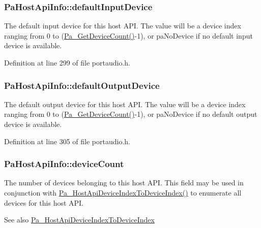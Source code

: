 \subsubsection[{\texorpdfstring{default\+Input\+Device}{defaultInputDevice}}]{ Pa\+Host\+Api\+Info\+::default\+Input\+Device}\hypertarget{struct_pa_host_api_info_a85a62057c3479d3efaa477d8562cf21d}{}\label{struct_pa_host_api_info_a85a62057c3479d3efaa477d8562cf21d}
The default input device for this host A\+PI. The value will be a device index ranging from 0 to (\hyperlink{portaudio_8h_acfe4d3c5ec1a343f459981bfa2057f8d}{Pa\+\_\+\+Get\+Device\+Count()}-\/1), or pa\+No\+Device if no default input device is available. 

Definition at line 299 of file portaudio.\+h.

\subsubsection[{\texorpdfstring{default\+Output\+Device}{defaultOutputDevice}}]{ Pa\+Host\+Api\+Info\+::default\+Output\+Device}\hypertarget{struct_pa_host_api_info_a62632690b5f7906d3c9bfdab91e7f4b2}{}\label{struct_pa_host_api_info_a62632690b5f7906d3c9bfdab91e7f4b2}
The default output device for this host A\+PI. The value will be a device index ranging from 0 to (\hyperlink{portaudio_8h_acfe4d3c5ec1a343f459981bfa2057f8d}{Pa\+\_\+\+Get\+Device\+Count()}-\/1), or pa\+No\+Device if no default output device is available. 

Definition at line 305 of file portaudio.\+h.

\subsubsection[{\texorpdfstring{device\+Count}{deviceCount}}]{ Pa\+Host\+Api\+Info\+::device\+Count}\hypertarget{struct_pa_host_api_info_a44e3adfaba0117a6780e2493468c96b1}{}\label{struct_pa_host_api_info_a44e3adfaba0117a6780e2493468c96b1}
The number of devices belonging to this host A\+PI. This field may be used in conjunction with \hyperlink{portaudio_8h_a54f306b5e5258323c95a27c5722258cd}{Pa\+\_\+\+Host\+Api\+Device\+Index\+To\+Device\+Index()} to enumerate all devices for this host A\+PI. \begin{DoxySeeAlso}{See also}
\hyperlink{pa__front_8c_a54f306b5e5258323c95a27c5722258cd}{Pa\+\_\+\+Host\+Api\+Device\+Index\+To\+Device\+Index} 
\end{DoxySeeAlso}


